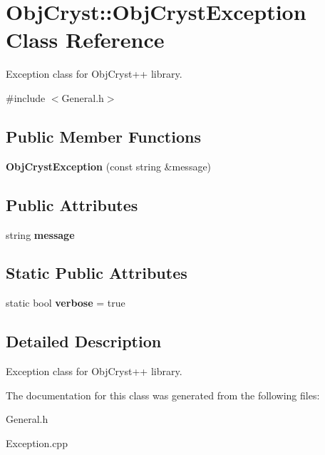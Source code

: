 \hypertarget{class_obj_cryst_1_1_obj_cryst_exception}{}\section{Obj\+Cryst\+::Obj\+Cryst\+Exception Class Reference}
\label{class_obj_cryst_1_1_obj_cryst_exception}


Exception class for Obj\+Cryst++ library.  




{\ttfamily \#include $<$General.\+h$>$}

\subsection*{Public Member Functions}
\begin{DoxyCompactItemize}
\item 
\mbox{\label{class_obj_cryst_1_1_obj_cryst_exception_ad678d8fd5936912af76bb39b7d68fdde}} 
{\bfseries Obj\+Cryst\+Exception} (const string \&message)
\end{DoxyCompactItemize}
\subsection*{Public Attributes}
\begin{DoxyCompactItemize}
\item 
\mbox{\label{class_obj_cryst_1_1_obj_cryst_exception_ad92e8d5369de58b6764f7c940dc7f0a6}} 
string {\bfseries message}
\end{DoxyCompactItemize}
\subsection*{Static Public Attributes}
\begin{DoxyCompactItemize}
\item 
\mbox{\label{class_obj_cryst_1_1_obj_cryst_exception_aa764ea2ee67edf7343b795cb8571b3c9}} 
static bool {\bfseries verbose} = true
\end{DoxyCompactItemize}


\subsection{Detailed Description}
Exception class for Obj\+Cryst++ library. 



The documentation for this class was generated from the following files\+:\begin{DoxyCompactItemize}
\item 
General.\+h\item 
Exception.\+cpp\end{DoxyCompactItemize}

